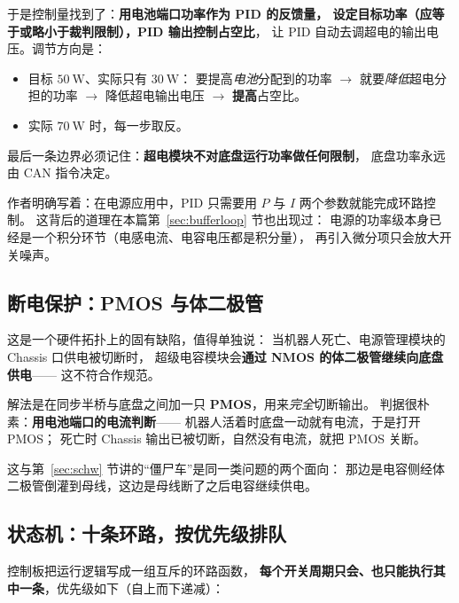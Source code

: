 \documentclass[cn,blue,11pt,device=normal]{elegantnote}
\begin{document}
于是控制量找到了：\textbf{用电池端口功率作为 PID 的反馈量，
设定目标功率（应等于或略小于裁判限制），PID 输出控制占空比}，
让 PID 自动去调超电的输出电压。调节方向是：

\begin{itemize}
  \item 目标 $50\ \mathrm{W}$、实际只有 $30\ \mathrm{W}$：
  要提高\emph{电池}分配到的功率 $\to$ 就要\emph{降低}超电分担的功率
  $\to$ 降低超电输出电压 $\to$ \textbf{提高}占空比。
  \item 实际 $70\ \mathrm{W}$ 时，每一步取反。
\end{itemize}

最后一条边界必须记住：\textbf{超电模块不对底盘运行功率做任何限制}，
底盘功率永远由 CAN 指令决定。

\begin{note}[电源环路只用 P 和 I]
作者明确写着：在电源应用中，PID 只需要用 $P$ 与 $I$ 两个参数就能完成环路控制。
这背后的道理在本篇第~\ref{sec:bufferloop} 节也出现过：
电源的功率级本身已经是一个积分环节（电感电流、电容电压都是积分量），
再引入微分项只会放大开关噪声。
\end{note}

\subsection{断电保护：PMOS 与体二极管}

这是一个硬件拓扑上的固有缺陷，值得单独说：
当机器人死亡、电源管理模块的 Chassis 口供电被切断时，
超级电容模块会\textbf{通过 NMOS 的体二极管继续向底盘供电}——
这不符合作规范。

解法是在同步半桥与底盘之间加一只 \textbf{PMOS}，用来\emph{完全}切断输出。
判据很朴素：\textbf{用电池端口的电流判断}——
机器人活着时底盘一动就有电流，于是打开 PMOS；
死亡时 Chassis 输出已被切断，自然没有电流，就把 PMOS 关断。

这与第~\ref{sec:schw} 节讲的“僵尸车”是同一类问题的两个面向：
那边是电容侧经体二极管倒灌到母线，这边是母线断了之后电容继续供电。

\subsection{状态机：十条环路，按优先级排队}

控制板把运行逻辑写成一组互斥的环路函数，
\textbf{每个开关周期只会、也只能执行其中一条}，优先级如下（自上而下递减）：
\end{document}
